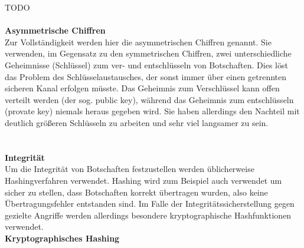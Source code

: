 \documentclass[12pt,a4paper,bibliography=totocnumbered,listof=totocnumbered]{scrartcl}
\begin{document}
\cite{6} \cite{7} \cite[S. 243f]{42} TODO
\\\\\textbf{Asymmetrische Chiffren}\\
Zur Vollständigkeit werden hier die asymmetrischen Chiffren genannt. Sie verwenden, im Gegensatz zu den symmetrischen Chiffren, zwei unterschiedliche Geheimnisse (Schlüssel) zum ver- und entschlüsseln von Botschaften. Dies löst das Problem des Schlüsselaustausches, der sonst immer über einen getrennten sicheren Kanal erfolgen müsste. Das Geheimnis zum Verschlüssel kann offen verteilt werden (der sog. public key), während das Geheimnis zum entschlüsseln (provate key) niemals heraus gegeben wird. Sie haben allerdings den Nachteil mit deutlich größeren Schlüsseln zu arbeiten und sehr viel langsamer zu sein.\\
\cite[S. 525]{42}
\\\\\textbf{Integrität}\\
Um die Integrität von Botschaften festzustellen werden üblicherweise Hashingverfahren verwendet. Hashing wird zum Beispiel auch verwendet um sicher zu stellen, dass Botschaften korrekt übertragen wurden, also keine Übertragungsfehler entstanden sind. Im Falle der Integritätssicherstellung gegen gezielte Angriffe werden allerdings besondere kryptographische Hashfunktionen verwendet.
\\\textbf{Kryptographisches Hashing}\\
\end{document}
